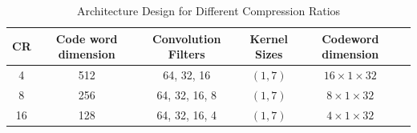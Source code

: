 \documentclass[lettersize,journal]{IEEEtran}
\begin{document}
\begin{table}[ht]
	\caption{Architecture Design for Different Compression Ratios}
	\label{table:model_comparison}
	\centering
	\begin{tabular}{cccccc}
		\toprule
		\textbf{CR} & \textbf{Code word dimension} & \textbf{Convolution Filters} & \textbf{Kernel Sizes} & \textbf{Codeword dimension} \\
		\midrule
		4 & 512 & 64, 32, 16 & $(1,7)$ & $16 \times 1 \times 32$ \\
		8 & 256 & 64, 32, 16, 8 & $(1,7)$ & $8 \times 1 \times 32$ \\
		16 & 128 & 64, 32, 16, 4 & $(1,7)$ & $4 \times 1 \times 32$ \\
		\bottomrule
	\end{tabular}
\end{table}
\end{document}
